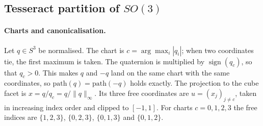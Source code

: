\begin{table}[t]
  \centering\footnotesize
  \caption{\textbf{Size $|\mathcal{S}|$ of the symmetry sets} used for training and evaluation. T-LESS continuous symmetries are discretised into 36 steps. Objects 18 and 21 have no symmetry in the BOP metadata.}
  \label{tab:app_symsets}
\end{table}

\subsection{Tesseract partition of $SO(3)$}\label{app:tesseract}

\paragraph{Charts and canonicalisation.}
Let $q\in S^3$ be normalised. The chart is $c=\arg\max_i|q_i|$; when two coordinates tie, the first maximum is taken. The quaternion is multiplied by $\operatorname{sign}(q_c)$, so that $q_c>0$. This makes $q$ and $-q$ land on the same chart with the same coordinates, so $\mathrm{path}(q)=\mathrm{path}(-q)$ holds exactly. The projection to the cube facet is $x=q/q_c=q/\|q\|_\infty$. Its three free coordinates are $u=(x_j)_{j\ne c}$, taken in increasing index order and clipped to $[-1,1]$. For charts $c=0,1,2,3$ the free indices are $\{1,2,3\}$, $\{0,2,3\}$, $\{0,1,3\}$ and $\{0,1,2\}$.

